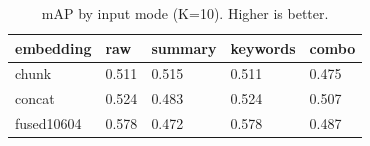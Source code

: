 \begin{table}
\caption{mAP by input mode (K=10). Higher is better.}
\label{tab:map-by-mode}
\begin{tabular}{lllll}
\toprule
embedding & raw & summary & keywords & combo \\
\midrule
chunk & 0.511 & 0.515 & 0.511 & 0.475 \\
concat & 0.524 & 0.483 & 0.524 & 0.507 \\
fused10604 & 0.578 & 0.472 & 0.578 & 0.487 \\
\bottomrule
\end{tabular}
\end{table}
